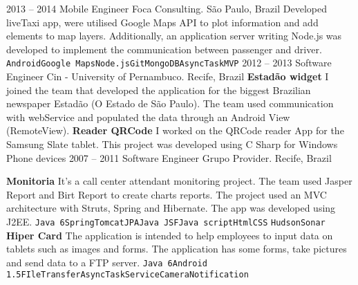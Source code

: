 \documentclass[9pt]{developercv} %
\begin{document}
\begin{entrylist}
{}
	\entry
		{2013 -- 2014}
		{Mobile Engineer}
		{Foca Consulting. São Paulo, Brazil}
{\newline
Developed liveTaxi app, were utilised Google Maps API to plot information and add elements to map layers. Additionally, an application server writing Node.js was developed to implement the communication between passenger and driver.\newline
		{\texttt{Android}\slashsep\texttt{Google Maps}\slashsep\texttt{Node.js}\slashsep\texttt{Git}\slashsep\texttt{MongoDB}\slashsep\texttt{AsyncTask}\slashsep\texttt{MVP}}}
\entry
		{2012 -- 2013}
		{Software Engineer}
		{Cin - University of Pernambuco. Recife, Brazil}
{\newline
\textbf{Estadão widget} I joined the team that developed the application for the biggest Brazilian newspaper Estadão (O Estado de São Paulo). The team used communication with webService and populated the data through an Android View (RemoteView).
\newline
\newline
\textbf{Reader QRCode} I worked on the QRCode reader App for the Samsung Slate tablet. This project was developed using C Sharp for Windows Phone devices
}
\entry
		{2007 -- 2011}
		{Software Engineer}
		{Grupo Provider. Recife, Brazil}
{\newline
  \textbf{Monitoria} It's a call center attendant monitoring project. The team used Jasper Report and Birt Report to create charts reports. The project used an MVC architecture with Struts, Spring and Hibernate. The app was developed using J2EE.\newline
{\texttt{Java 6}\slashsep\texttt{Spring}\slashsep\texttt{Tomcat}\slashsep\texttt{JPA}\slashsep\texttt{Java JSF}\slashsep\texttt{Java script}\slashsep\texttt{Html}\slashsep\texttt{CSS}} \slashsep\texttt{Hudson}\slashsep\texttt{Sonar}
\newline
\newline
\textbf{Hiper Card}  The application is intended to help employees to input data on tablets such as images and forms. The application has some forms, take pictures and send data to a FTP server.
\newline
{\texttt{Java 6}\slashsep\texttt{Android 1.5}\slashsep\texttt{FIleTransfer}\slashsep\texttt{AsyncTask}\slashsep\texttt{Service}\slashsep\texttt{Camera}\slashsep\texttt{Notification}}

}
\end{entrylist}

\end{document}

